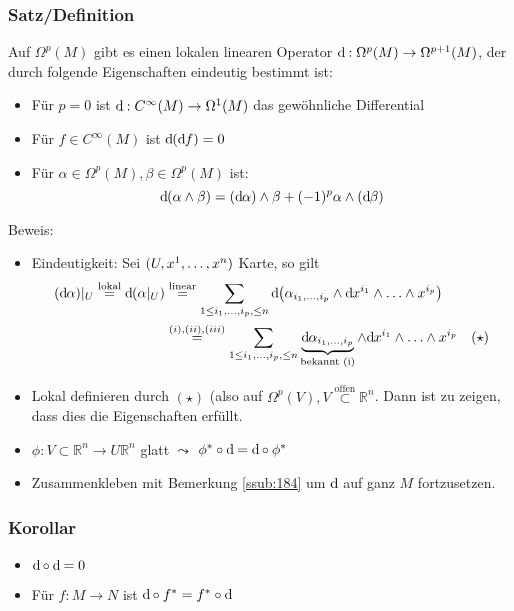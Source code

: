 \subsubsection{Satz/Definition}
\label{ssub:191}
Auf $\Omega^p(M)$ gibt es einen lokalen linearen Operator $\mathrm{d}\mkern-1.0mu : \Omega^p (M) \to \Omega^{p+1} (M)$, der durch folgende Eigenschaften eindeutig bestimmt ist:
\begin{itemize}
\item Für $p = 0$ ist $\mathrm{d}\mkern-1.0mu: C^\infty (M) \to \Omega^1 (M)$ das gewöhnliche Differential
\item Für $f\in C^\infty (M)$ ist $\mathrm{d}\mkern-1.0mu(\mathrm{d}\mkern-1.0mu f) = 0$
\item Für $\alpha\in \Omega^p(M), \beta \in \Omega^p(M)$ ist:
\[
\mathrm{d}\mkern-1.0mu(\alpha \wedge \beta) = (\mathrm{d}\mkern-1.0mu \alpha) \wedge \beta + (-1)^p \alpha \wedge (\mathrm{d}\mkern-1.0mu \beta)
\]
\end{itemize}
Beweis:
\begin{itemize}
\item Eindeutigkeit: Sei $(U,x^1,\ldots,x^n)$ Karte, so gilt
\begin{align*}
(\mathd \alpha)\vert_U \overset{\text{lokal}}{=} \mathd(\alpha\vert_U) &\overset{\text{linear}}{=} \sum_{1\leq i_1,\ldots,i_p,\leq n} \mathd \enbrace*{\alpha_{i_1,\ldots, i_p} \wedge \mathd x^{i_1} \wedge \ldots \wedge x^{i_p}}\\
&\overset{(i),(ii),(iii)}{=} \sum_{1\leq i_1,\ldots,i_p,\leq n} \underbrace{\mathd\alpha_{i_1,\ldots, i_p}}_{\text{bekannt (i)}} \wedge \mathd x^{i_1} \wedge \ldots \wedge x^{i_p}\quad (\star)
\end{align*}
\item Lokal definieren durch $(\star)$ (also auf $\Omega^p (V), V\overset{\text{offen}}{\subset} \mathds{R}^n$. Dann ist zu zeigen, dass dies die Eigenschaften erfüllt.
\item $\phi: V\subset \mathds{R}^n \to U \mathds{R}^n$ glatt $\leadsto$ $\phi^* \circ \mathrm{d}\mkern-1.0mu = \mathrm{d}\mkern-1.0mu \circ \phi^*$
\item Zusammenkleben mit Bemerkung \ref{ssub:184} um $\mathrm{d}\mkern-1.0mu$ auf ganz $M$ fortzusetzen.
\end{itemize}

\subsubsection{Korollar}
\label{ssub:192}
\begin{itemize}
\item $\mathrm{d}\mkern-1.0mu \circ \mathrm{d}\mkern-1.0mu = 0$
\item Für $f:M\to N$ ist $\mathrm{d}\mkern-1.0mu \circ f^* = f^* \circ \mathrm{d}\mkern-1.0mu$
\end{itemize}

